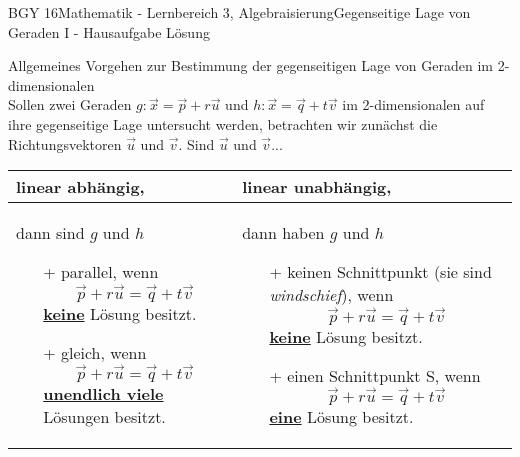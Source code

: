 \documentclass[oneside,openany,headings=optiontotoc,11pt,numbers=noenddot]{scrreprt}
\begin{document}
	\begin{worksheet}{BGY 16}{Mathematik - Lernbereich 3, Algebraisierung}{Gegenseitige Lage von Geraden I - Hausaufgabe Lösung}
		
		\begin{framed}
			\noindent
			\tiny{\color{codegray}Allgemeines Vorgehen zur Bestimmung der gegenseitigen Lage von Geraden im 2-dimensionalen}\\
			\normalsize
			Sollen zwei Geraden \(g: \vec{x} = \vec{p} + r\vec{u}\) und \(h: \vec{x} = \vec{q}+ t\vec{v}\) im 2-dimensionalen auf ihre gegenseitige Lage untersucht werden, betrachten wir zunächst die Richtungsvektoren \(\vec{u}\) und \(\vec{v}\). Sind \(\vec{u}\) und \(\vec{v}\)...\\
			\par\noindent
			\begin{tabularx}{\textwidth}{X|X}
				\color{blue}linear abhängig\normalcolor, & \color{blue}linear unabhängig\normalcolor,\\
				\hline
				dann sind \(g\) und \(h\)
				\begin{itemize}
					\item[+] \color{red}parallel\normalcolor{}, wenn \[\vec{p} + r\vec{u} = \vec{q} + t\vec{v}\] \underline{\textbf{keine}} Lösung besitzt.
					\item[+] \color{codegreen}gleich\normalcolor{}, wenn \[\vec{p} + r\vec{u} = \vec{q} + t\vec{v}\] \underline{\textbf{unendlich viele}} Lösungen besitzt.
				\end{itemize} & dann haben \(g\) und \(h\)
			\begin{itemize}
				\item[+] \color{red}keinen\normalcolor{} Schnittpunkt (sie sind \textit{windschief}), wenn \[\vec{p} + r\vec{u} = \vec{q} + t\vec{v}\] \underline{\textbf{keine}} Lösung besitzt.
				\item[+] \color{codegreen}einen\normalcolor{} Schnittpunkt S, wenn \[\vec{p} + r\vec{u} = \vec{q} + t\vec{v}\] \underline{\textbf{eine}} Lösung besitzt.
				
		\end{itemize}\\
			\end{tabularx}
		\end{framed}
		

\end{worksheet}
\end{document}
